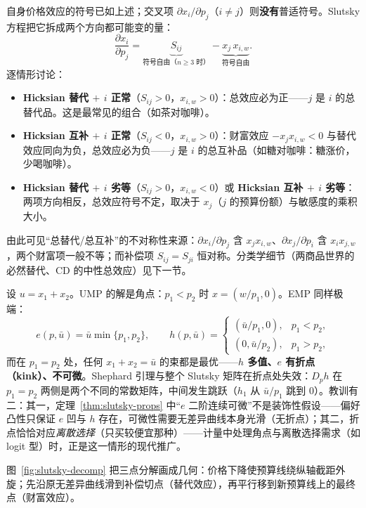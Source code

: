 自身价格效应的符号已如上述；交叉项 $\partial x_i/\partial p_j$（$i\ne j$）则\textbf{没有}普适符号。Slutsky 方程把它拆成两个方向都可能变的量：
\[
 \frac{\partial x_i}{\partial p_j}
 =\underbrace{S_{ij}}_{\text{符号自由（}n\ge3\text{ 时）}}
 -\underbrace{x_j\,x_{i,w}}_{\text{符号自由}} .
\]
逐情形讨论：
\begin{itemize}
\item \textbf{Hicksian 替代 $+$ $i$ 正常}（$S_{ij}>0$，$x_{i,w}>0$）：总效应必为正——$j$ 是 $i$ 的总替代品。这是最常见的组合（如茶对咖啡）。
\item \textbf{Hicksian 互补 $+$ $i$ 正常}（$S_{ij}<0$，$x_{i,w}>0$）：财富效应 $-x_jx_{i,w}<0$ 与替代效应同向为负，总效应必为负——$j$ 是 $i$ 的总互补品（如糖对咖啡：糖涨价，少喝咖啡）。
\item \textbf{Hicksian 替代 $+$ $i$ 劣等}（$S_{ij}>0$，$x_{i,w}<0$）或 \textbf{Hicksian 互补 $+$ $i$ 劣等}：两项方向相反，总效应符号不定，取决于 $x_j$（$j$ 的预算份额）与敏感度的乘积大小。
\end{itemize}
由此可见“总替代/总互补”的不对称性来源：$\partial x_i/\partial p_j$ 含 $x_j x_{i,w}$、$\partial x_j/\partial p_i$ 含 $x_i x_{j,w}$，两个财富项一般不等；而补偿项 $S_{ij}=S_{ji}$ 恒对称。分类学细节（两商品世界的必然替代、CD 的中性总效应）见下一节。

\begin{example}\label{ex:perf-sub}
设 $u=x_1+x_2$。UMP 的解是角点：$p_1<p_2$ 时 $x=(w/p_1,0)$。EMP 同样极端：
\[
 e(p,\bar u)=\bar u\min\{p_1,p_2\},\qquad
 h(p,\bar u)=
 \begin{cases}
 (\bar u/p_1,0), & p_1<p_2,\\
 (0,\bar u/p_2), & p_1>p_2,
 \end{cases}
\]
而在 $p_1=p_2$ 处，任何 $x_1+x_2=\bar u$ 的束都是最优——\textbf{$h$ 多值、$e$ 有折点（kink）、不可微}。Shephard 引理与整个 Slutsky 矩阵在折点处失效：$D_p h$ 在 $p_1=p_2$ 两侧是两个不同的常数矩阵，中间发生跳跃（$h_1$ 从 $\bar u/p_1$ 跳到 $0$）。教训有二：其一，定理~\ref{thm:slutsky-props} 中“$e$ 二阶连续可微”不是装饰性假设——偏好凸性只保证 $e$ 凹与 $h$ 存在，可微性需要无差异曲线本身光滑（无折点）；其二，折点恰恰对应\emph{离散选择}（只买较便宜那种）——计量中处理角点与离散选择需求（如 logit 型）时，正是这一情形的现代推广。
\end{example}

图~\ref{fig:slutsky-decomp} 把三点分解画成几何：价格下降使预算线绕纵轴截距外旋；先沿原无差异曲线滑到补偿切点（替代效应），再平行移到新预算线上的最终点（财富效应）。

